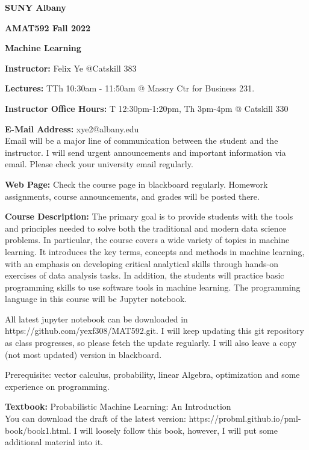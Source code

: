 \documentclass[a4paper,10pt]{article}
\begin{document}
\begin{center}

\textbf{SUNY Albany}

\textbf{AMAT592 Fall 2022}

\textbf{Machine Learning}


\end{center}

\textbf{Instructor:} Felix Ye @Catskill 383

\textbf{Lectures:} TTh 10:30am - 11:50am  @ Massry Ctr for Business 231.

\textbf{Instructor Office Hours:}  T 12:30pm-1:20pm, Th 3pm-4pm @ Catskill 330


\textbf{E-Mail Address:} xye2@albany.edu\\
Email will be a major line of communication between the student and the instructor. I will send urgent announcements and important information via email. Please check your university email regularly.

\textbf{Web Page:}
Check the course page in blackboard regularly. Homework assignments, course announcements, and grades will be posted there.


\textbf{Course Description:} The primary goal is to provide students with the tools and principles needed to solve both the traditional and modern data science problems. In particular, the course covers a wide variety of topics in machine learning. It introduces the key terms, concepts and methods in machine learning, with an emphasis on developing critical analytical skills through hands-on exercises of data analysis tasks. In addition, the students will practice basic programming skills to use software tools in machine learning. The programming language in this course will be Jupyter notebook. 

All latest jupyter notebook can be downloaded in https://github.com/yexf308/MAT592.git. I will keep updating this git repository as class progresses, so please fetch the update regularly. I will also leave a copy (not most updated) version in blackboard. 

 Prerequisite: vector calculus, probability, linear Algebra, optimization and some experience on programming. 
 

\textbf{Textbook:} Probabilistic Machine Learning: An Introduction \\
You can download the draft of the latest version: https://probml.github.io/pml-book/book1.html. 
 I will loosely follow this book, however, I will put some additional material into it.
\end{document}
